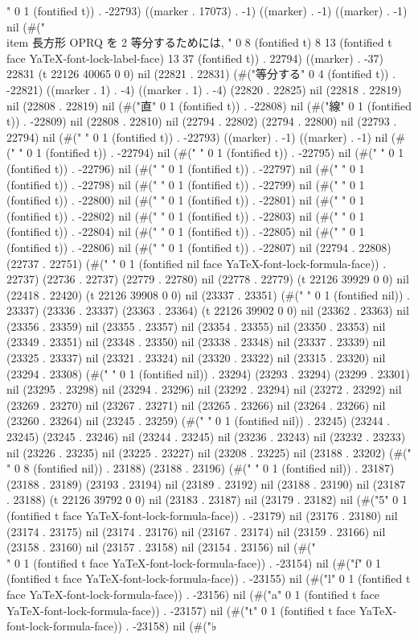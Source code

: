 {" 0 1 (fontified t)) . -22793) ((marker . 17073) . -1) ((marker) . -1) ((marker) . -1) nil (#("        \\item 長方形 OPRQ を 2 等分するためには, " 0 8 (fontified t) 8 13 (fontified t face YaTeX-font-lock-label-face) 13 37 (fontified t)) . 22794) ((marker) . -37) 22831 (t 22126 40065 0 0) nil (22821 . 22831) (#("等分する" 0 4 (fontified t)) . -22821) ((marker . 1) . -4) ((marker . 1) . -4) (22820 . 22825) nil (22818 . 22819) nil (22808 . 22819) nil (#("直" 0 1 (fontified t)) . -22808) nil (#("線" 0 1 (fontified t)) . -22809) nil (22808 . 22810) nil (22794 . 22802) (22794 . 22800) nil (22793 . 22794) nil (#("
" 0 1 (fontified t)) . -22793) ((marker) . -1) ((marker) . -1) nil (#(" " 0 1 (fontified t)) . -22794) nil (#(" " 0 1 (fontified t)) . -22795) nil (#(" " 0 1 (fontified t)) . -22796) nil (#(" " 0 1 (fontified t)) . -22797) nil (#(" " 0 1 (fontified t)) . -22798) nil (#(" " 0 1 (fontified t)) . -22799) nil (#(" " 0 1 (fontified t)) . -22800) nil (#(" " 0 1 (fontified t)) . -22801) nil (#(" " 0 1 (fontified t)) . -22802) nil (#(" " 0 1 (fontified t)) . -22803) nil (#(" " 0 1 (fontified t)) . -22804) nil (#(" " 0 1 (fontified t)) . -22805) nil (#(" " 0 1 (fontified t)) . -22806) nil (#(" " 0 1 (fontified t)) . -22807) nil (22794 . 22808) (22737 . 22751) (#(" " 0 1 (fontified nil face YaTeX-font-lock-formula-face)) . 22737) (22736 . 22737) (22779 . 22780) nil (22778 . 22779) (t 22126 39929 0 0) nil (22418 . 22420) (t 22126 39908 0 0) nil (23337 . 23351) (#(" " 0 1 (fontified nil)) . 23337) (23336 . 23337) (23363 . 23364) (t 22126 39902 0 0) nil (23362 . 23363) nil (23356 . 23359) nil (23355 . 23357) nil (23354 . 23355) nil (23350 . 23353) nil (23349 . 23351) nil (23348 . 23350) nil (23338 . 23348) nil (23337 . 23339) nil (23325 . 23337) nil (23321 . 23324) nil (23320 . 23322) nil (23315 . 23320) nil (23294 . 23308) (#(" " 0 1 (fontified nil)) . 23294) (23293 . 23294) (23299 . 23301) nil (23295 . 23298) nil (23294 . 23296) nil (23292 . 23294) nil (23272 . 23292) nil (23269 . 23270) nil (23267 . 23271) nil (23265 . 23266) nil (23264 . 23266) nil (23260 . 23264) nil (23245 . 23259) (#(" " 0 1 (fontified nil)) . 23245) (23244 . 23245) (23245 . 23246) nil (23244 . 23245) nil (23236 . 23243) nil (23232 . 23233) nil (23226 . 23235) nil (23225 . 23227) nil (23208 . 23225) nil (23188 . 23202) (#("        " 0 8 (fontified nil)) . 23188) (23188 . 23196) (#(" " 0 1 (fontified nil)) . 23187) (23188 . 23189) (23193 . 23194) nil (23189 . 23192) nil (23188 . 23190) nil (23187 . 23188) (t 22126 39792 0 0) nil (23183 . 23187) nil (23179 . 23182) nil (#("5" 0 1 (fontified t face YaTeX-font-lock-formula-face)) . -23179) nil (23176 . 23180) nil (23174 . 23175) nil (23174 . 23176) nil (23167 . 23174) nil (23159 . 23166) nil (23158 . 23160) nil (23157 . 23158) nil (23154 . 23156) nil (#("\\" 0 1 (fontified t face YaTeX-font-lock-formula-face)) . -23154) nil (#("f" 0 1 (fontified t face YaTeX-font-lock-formula-face)) . -23155) nil (#("l" 0 1 (fontified t face YaTeX-font-lock-formula-face)) . -23156) nil (#("a" 0 1 (fontified t face YaTeX-font-lock-formula-face)) . -23157) nil (#("t" 0 1 (fontified t face YaTeX-font-lock-formula-face)) . -23158) nil (#("♭
}
